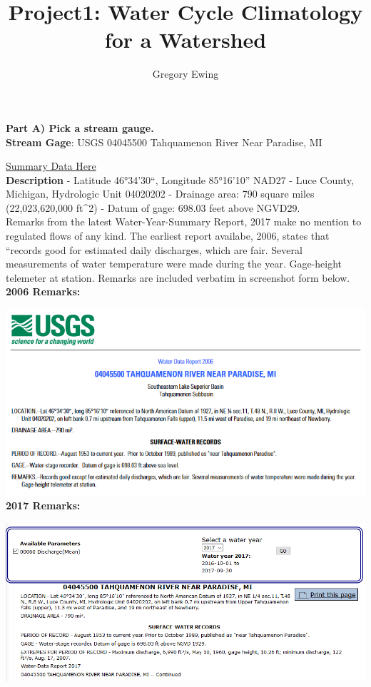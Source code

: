 \documentclass[11pt]{article}
\title{Project1: Water Cycle Climatology for a Watershed}
\author{Gregory Ewing}
\makeatletter
\def\maxwidth{\ifdim\Gin@nat@width>\linewidth\linewidth
    \else\Gin@nat@width\fi}
\let\Oldincludegraphics\includegraphics
\renewcommand{\includegraphics}[1]{\Oldincludegraphics[width=.8\maxwidth]{#1}}
\makeatother
\begin{document}
    
    
    \maketitle
    


\textbf{Part A) Pick a stream gauge.} \\

\textbf{Stream Gage}: USGS 04045500 Tahquamenon River Near Paradise, MI

\href{https://waterdata.usgs.gov/nwis/inventory/?site_no=04045500\&agency_cd=USGS}{Summary
Data Here}\\

\textbf{Description} - Latitude 46°34'30``, Longitude 85°16'10'' NAD27 -
Luce County, Michigan, Hydrologic Unit 04020202 - Drainage area: 790
square miles (22,023,620,000 ft\^{}2) - Datum of gage: 698.03 feet above
NGVD29.\\

Remarks from the latest Water-Year-Summary Report, 2017 make no mention
to regulated flows of any kind. The earliest report availabe, 2006,
states that ``records good for estimated daily discharges, which are
fair. Several measurements of water temperature were made during the
year. Gage-height telemeter at station. Remarks are included verbatim in
screenshot form below.\\

\textbf{2006 Remarks:}

\includegraphics{2006_WaterYearSummaryRemarks.PNG} \\

\textbf{2017 Remarks:}

\includegraphics{2017_WaterYearSummaryRemarks.PNG} \\
\end{document}
